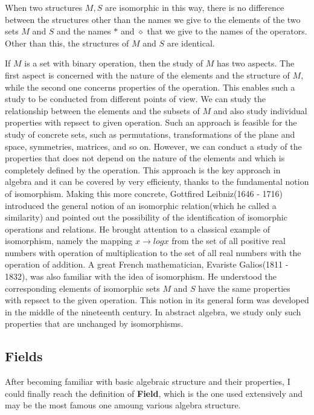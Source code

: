 \documentclass[a4paper]{book}
\begin{document}
    When two structures $M,S$ are isomorphic in this way, there is no
    difference between the structures other than the names we give to the
    elements of the two sets $M$ and $S$ and the names $\ast$ and $\diamond$
    that we give to the names of the operators. Other than this, the
    structures of $M$ and $S$ are identical.\cite{dixon2011algebra}

    If $M$ is a set with binary operation, then the study of $M$ has two
    aspects. The first aspect is concerned with the nature of the elements
    and the structure of $M$, while the second one concerns properties of
    the operation. This enables such a study to be conducted from different
    points of view. We can study the relationship between the elements and
    the subsets of $M$ and also study individual properties with repsect to
    given operation. Such an approach is feasible for the study of concrete
    sets, such as permutations, transformations of the plane and space,
    symmetries, matrices, and so on. However, we can conduct a study of the
    properties that does not depend on the nature of the elements and which
    is completely defined by the operation. This approach is the key
    approach in algebra and it can be covered by very efficienty, thanks to
    the fundamental notion of isomorphism. Making this more concrete,
    Gottfired Leibniz(1646 - 1716) introduced the general notion of an
    isomorphic relation(which he called a similarity) and pointed out the
    possibility of the identification of isomorphic operations and
    relations. He brought attention to a classical example of isomorphism,
    namely the mapping $x \rightarrow logx$ from the set of all positive
    real numbers with operation of multiplication to the set of all real
    numbers with the operation of addition. A great French mathematician,
    Evariste Galios(1811 - 1832), was also familiar with the idea of
    isomorphism. He understood the corresponding elements of isomorphic sets
    $M$ and $S$ have the same properties with repsect to the given
    operation. This notion in its general form was developed in the middle
    of the nineteenth century. In abstract algebra, we study only such
    properties that are unchanged by isomorphisms.\cite{dixon2011algebra}

    \subsection{Fields}

    After becoming familiar with basic algebraic structure and their
    properties, I could finally reach the definition of \textbf{Field},
    which is the one used extensively and may be the most famous one
    amoung various algebra structure.
\end{document}
